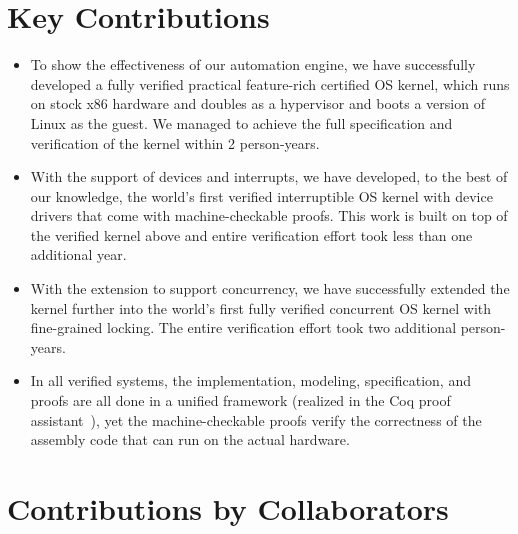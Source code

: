 \section{Key Contributions}

\begin{itemize}
\item To show the effectiveness of our automation engine, we have
successfully developed a fully verified
practical feature-rich certified OS kernel, which runs
on stock x86 hardware and doubles as a hypervisor and boots a version of Linux as the guest.
We managed to achieve the full specification and verification of the kernel within
2 person-years.

\item With the support of devices and interrupts, 
we have developed, to the best of our knowledge, the world's first verified
interruptible OS kernel with device drivers that come with
  machine-checkable proofs. This work is built on top of the verified kernel above
  and entire verification effort took less than one additional year.
  
\item With the extension to support concurrency, we have
successfully extended the kernel further
into the world's first fully verified concurrent OS kernel with fine-grained locking.
The entire verification effort took two additional person-years.

\item In all verified systems, the implementation, modeling, specification, and
  proofs are all done in a unified framework (realized in the Coq
  proof assistant~\cite{coq}), yet the machine-checkable proofs verify the
  correctness of the assembly code that can run on the actual
  hardware.
  
\end{itemize}

\section{Contributions by Collaborators}

